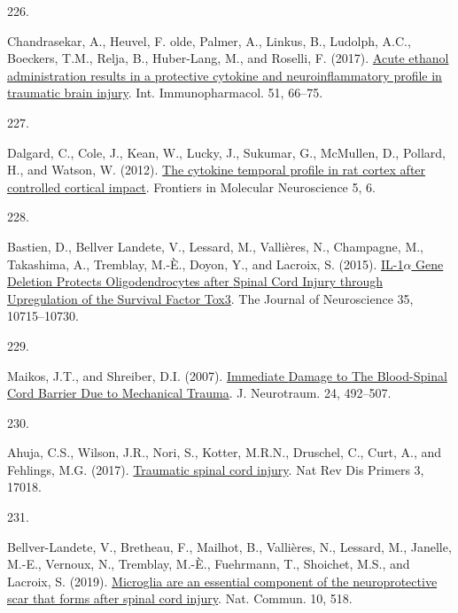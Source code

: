 \documentclass[
]{article}
\newlength{\cslhangindent}
\newlength{\csllabelwidth}
\newlength{\cslentryspacingunit} %
\newenvironment{CSLReferences}[2] %
 {%
  \setlength{\parindent}{0pt}
  \ifodd #1
  \let\oldpar\par
  \def\par{\hangindent=\cslhangindent\oldpar}
  \fi
  \setlength{\parskip}{#2\cslentryspacingunit}
 }%
 {}
\newcommand{\CSLLeftMargin}[1]{\parbox[t]{\csllabelwidth}{#1}}
\newcommand{\CSLRightInline}[1]{\parbox[t]{\linewidth - \csllabelwidth}{#1}\break}
\begin{document}
\begin{CSLReferences}{0}{0}
\leavevmode{}%
\CSLLeftMargin{226. }
\CSLRightInline{Chandrasekar, A., Heuvel, F. olde, Palmer, A., Linkus, B., Ludolph, A.C., Boeckers, T.M., Relja, B., Huber-Lang, M., and Roselli, F. (2017). \href{https://doi.org/10.1016/j.intimp.2017.08.002}{Acute ethanol administration results in a protective cytokine and neuroinflammatory profile in traumatic brain injury}. Int. Immunopharmacol. 51, 66--75.}

\leavevmode{}%
\CSLLeftMargin{227. }
\CSLRightInline{Dalgard, C., Cole, J., Kean, W., Lucky, J., Sukumar, G., McMullen, D., Pollard, H., and Watson, W. (2012). \href{https://doi.org/10.3389/fnmol.2012.00006}{The cytokine temporal profile in rat cortex after controlled cortical impact}. Frontiers in Molecular Neuroscience 5, 6.}

\leavevmode{}%
\CSLLeftMargin{228. }
\CSLRightInline{Bastien, D., Bellver Landete, V., Lessard, M., Vallières, N., Champagne, M., Takashima, A., Tremblay, M.-È., Doyon, Y., and Lacroix, S. (2015). \href{https://doi.org/10.1523/JNEUROSCI.0498-15.2015}{{IL-1\(\alpha\) Gene Deletion Protects Oligodendrocytes} after {Spinal Cord Injury} through {Upregulation} of the {Survival Factor Tox3}}. The Journal of Neuroscience 35, 10715--10730.}

\leavevmode{}%
\CSLLeftMargin{229. }
\CSLRightInline{Maikos, J.T., and Shreiber, D.I. (2007). \href{https://doi.org/10.1089/neu.2006.0149}{Immediate {Damage} to {The Blood-Spinal Cord Barrier Due} to {Mechanical Trauma}}. J. Neurotraum. 24, 492--507.}

\leavevmode{}%
\CSLLeftMargin{230. }
\CSLRightInline{Ahuja, C.S., Wilson, J.R., Nori, S., Kotter, M.R.N., Druschel, C., Curt, A., and Fehlings, M.G. (2017). \href{https://doi.org/10.1038/nrdp.2017.18}{Traumatic spinal cord injury}. Nat Rev Dis Primers 3, 17018.}

\leavevmode{}%
\CSLLeftMargin{231. }
\CSLRightInline{Bellver-Landete, V., Bretheau, F., Mailhot, B., Vallières, N., Lessard, M., Janelle, M.-E., Vernoux, N., Tremblay, M.-È., Fuehrmann, T., Shoichet, M.S., and Lacroix, S. (2019). \href{https://doi.org/10.1038/s41467-019-08446-0}{Microglia are an essential component of the neuroprotective scar that forms after spinal cord injury}. Nat. Commun. 10, 518.}


\end{CSLReferences}
\end{document}
